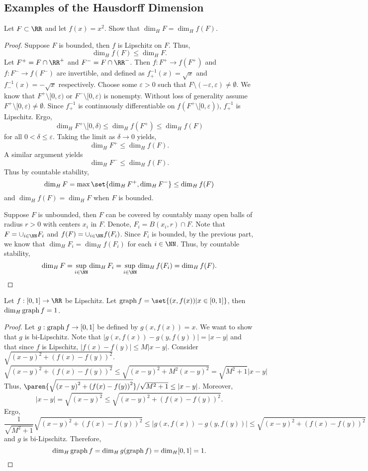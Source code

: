 \subsection{Examples of the Hausdorff Dimension}

\begin{example}
	Let $F\subset\RR$ and let $f(x)=x^2$.
	Show that $\dim_H F = \dim_H f(F)$.
\end{example}

\begin{proof}
	Suppose $F$ is bounded, then $f$ is Lipschitz on $F$.
	Thus,
	\[
		\dim_H f(F) \leq \dim_H F.
	\]
	Let $F^+=F\cap\RR^+$ and $F^-=F\cap\RR^-$.
	Then $f:F^+\rightarrow f(F^+)$ and $f:F^-\rightarrow f(F^-)$ are invertible, and defined as $f^{-1}_+(x)=\sqrt{x}$ and $f^{-1}_-(x)=-\sqrt{x}$ respectively.
	Choose some $\varepsilon>0$ such that $F\setminus(-\varepsilon,\varepsilon)\neq\emptyset$.
	We know that $F^+\setminus[0,\varepsilon)$ or $F^-\setminus[0,\varepsilon)$ is nonempty. %
	Without loss of generality assume $F^+\setminus[0,\varepsilon)\neq\emptyset$. %
	Since $f^{-1}_+$ is continuously differentiable on $f(F^+\setminus[0,\varepsilon))$, $f^{-1}_+$ is Lipschitz. %
	Ergo,
	\[
		\dim_H F^+\setminus[0,\delta) \leq \dim_H f(F^+)\leq \dim_H f(F) %
	\]
	for all $0 < \delta \leq \varepsilon$.
	Taking the limit as $\delta\rightarrow 0$ yields,
	\[
		\dim_H F^+ \leq \dim_H f(F).
	\]
	A similar argument yields
	\[
		\dim_H F^- \leq \dim_H f(F).
	\]
	Thus by countable stability,
	\[
		\dim_H F = \max \set{\dim_H F^+, \dim_H F^-}\leq \dim_H f(F)
	\]
	and $\dim_H f(F)=\dim_H F$ when $F$ is bounded.

	Suppose $F$ is unbounded, then $F$ can be covered by countably many open balls of radius $r>0$ with centers $x_i$ in $F$.
	Denote, $F_i=B(x_i,r)\cap F$.
	Note that $F=\cup_{i\in\NN} F_i$ and $f(F)=\cup_{i\in\NN} f(F_i)$.
	Since $F_i$ is bounded, by the previous part, we know that $\dim_H F_i = \dim_H f(F_i)$ for each $i\in\NN$.
	Thus, by countable stability,
	\[
		\dim_H F = \sup\limits_{i\in\NN} \dim_H F_i = \sup\limits_{i\in\NN} \dim_H f(F_i)=\dim_H f(F).
	\]
\end{proof}

\begin{example}
	Let $f:[0,1]\rightarrow\RR$ be Lipschitz.
	Let $\gra f=\set{(x,f(x))|x\in[0,1]}$, then $\operatorname{dim}_H \operatorname{graph} f =1$.
\end{example}
\begin{proof}
	Let $g:\operatorname{graph} f\rightarrow [0,1]$ be defined by $g(x,f(x))=x$.
	We want to show that $g$ is bi-Lipschitz.
	Note that $|g(x,f(x))-g(y,f(y))|=|x-y|$ and that since $f$ is Lipschitz, $|f(x)-f(y)|\leq M|x-y|$.
	Consider $\sqrt{{(x-y)}^2+{(f(x)-f(y))}^2}$.
	\[
		\sqrt{{(x-y)}^2+{(f(x)-f(y))}^2}
		\leq \sqrt{{(x-y)}^2+M^2{(x-y)}^2}
		=\sqrt{M^2+1}|x-y|
	\]
	Thus, $\paren{\sqrt{{(x-y)}^2+{(f(x)-f(y))}^2}}/\sqrt{M^2+1}\leq|x-y|$.
	Moreover,
	\[
		|x-y|=\sqrt{{(x-y)}^2}\leq\sqrt{{(x-y)}^2+{(f(x)-f(y))}^2}.
	\]
	Ergo,
	\[
		\frac{1}{\sqrt{M^2+1}}\sqrt{{(x-y)}^2+{(f(x)-f(y))}^2}
		\leq |g(x,f(x))-g(y,f(y))|
		\leq \sqrt{{(x-y)}^2+{(f(x)-f(y))}^2}
	\]
	and $g$ is bi-Lipschitz.
	Therefore,
	\[
		\operatorname{dim}_H \operatorname{graph} f = \operatorname{dim}_H g(\operatorname{graph} f) = \operatorname{dim}_H [0,1] = 1.
	\]
\end{proof}

